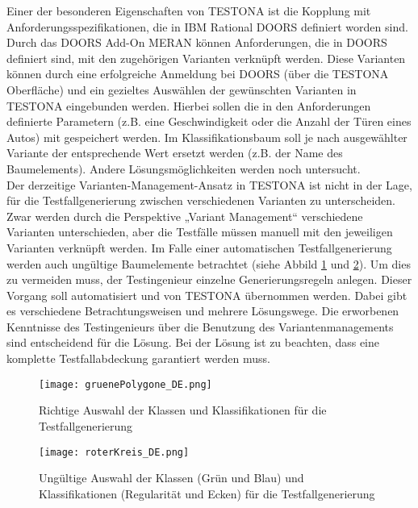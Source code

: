 Einer der besonderen Eigenschaften von TESTONA ist die Kopplung mit Anforderungsspezifikationen, die in IBM Rational DOORS definiert worden sind. Durch das DOORS Add-On MERAN können Anforderungen, die in DOORS definiert sind, mit den zugehörigen Varianten verknüpft werden. Diese Varianten können durch eine erfolgreiche Anmeldung bei DOORS (über die TESTONA Oberfläche) und ein gezieltes Auswählen der gewünschten Varianten in TESTONA eingebunden werden. Hierbei sollen die in den Anforderungen definierte Parametern (z.B. eine Geschwindigkeit oder die Anzahl der Türen eines Autos) mit gespeichert werden. Im Klassifikationsbaum soll je nach ausgewählter Variante der entsprechende Wert ersetzt werden (z.B. der Name des Baumelements). Andere Lösungsmöglichkeiten werden noch untersucht.\\

Der derzeitige Varianten-Management-Ansatz in TESTONA ist nicht in der Lage, für die Testfallgenerierung zwischen verschiedenen Varianten zu unterscheiden. Zwar werden durch die Perspektive „Variant Management“ verschiedene Varianten unterschieden, aber die Testfälle müssen manuell mit den jeweiligen Varianten verknüpft werden. Im Falle einer automatischen Testfallgenerierung werden auch ungültige Baumelemente betrachtet (siehe Abbild \ref{ttn.gruen} und \ref{ttn.rot}). Um dies zu vermeiden muss, der Testingenieur einzelne Generierungsregeln anlegen. Dieser Vorgang soll automatisiert und von TESTONA übernommen werden. Dabei gibt es verschiedene Betrachtungsweisen und mehrere Lösungswege. Die erworbenen Kenntnisse des Testingenieurs über die Benutzung des Variantenmanagements sind entscheidend für die Lösung. Bei der Lösung ist zu beachten, dass eine komplette Testfallabdeckung garantiert werden muss.\\

\hspace{3cm}

\begin{figure}[h]
  \begin{center}
    \texttt{[image: gruenePolygone\_DE.png]}
  		  \caption{Richtige Auswahl der Klassen und Klassifikationen für die Testfallgenerierung}
     \label{ttn.gruen}
  \end{center}
\end{figure}


\begin{figure}[!htb]
  \begin{center}
    \texttt{[image: roterKreis\_DE.png]}
  		  \caption{Ungültige Auswahl der Klassen (Grün und Blau) und Klassifikationen (Regularität und Ecken) für die Testfallgenerierung}
     \label{ttn.rot}
  \end{center}
\end{figure}

